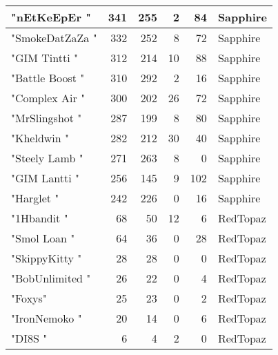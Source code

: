 \documentclass{article}
\begin{document}
\begin{table}[htbp]
\begin{tabular}{|l|r|r|r|r|l|}
"nEtKeEpEr " & 341 & 255 & 2 & 84 & Sapphire \\ \hline
"SmokeDatZaZa " & 332 & 252 & 8 & 72 & Sapphire \\ \hline
"GIM Tintti " & 312 & 214 & 10 & 88 & Sapphire \\ \hline
"Battle Boost " & 310 & 292 & 2 & 16 & Sapphire \\ \hline
"Complex Air " & 300 & 202 & 26 & 72 & Sapphire \\ \hline
"MrSlingshot " & 287 & 199 & 8 & 80 & Sapphire \\ \hline
"Kheldwin " & 282 & 212 & 30 & 40 & Sapphire \\ \hline
"Steely Lamb " & 271 & 263 & 8 & 0 & Sapphire \\ \hline
"GIM Lantti " & 256 & 145 & 9 & 102 & Sapphire \\ \hline
"Harglet " & 242 & 226 & 0 & 16 & Sapphire \\ \hline
"1Hbandit " & 68 & 50 & 12 & 6 & RedTopaz \\ \hline
"Smol Loan " & 64 & 36 & 0 & 28 & RedTopaz \\ \hline
"SkippyKitty " & 28 & 28 & 0 & 0 & RedTopaz \\ \hline
"BobUnlimited " & 26 & 22 & 0 & 4 & RedTopaz \\ \hline
"Foxys" & 25 & 23 & 0 & 2 & RedTopaz \\ \hline
"IronNemoko " & 20 & 14 & 0 & 6 & RedTopaz \\ \hline
"DI8S " & 6 & 4 & 2 & 0 & RedTopaz \\ \hline
\end{tabular}
\end{table}
\end{document}
